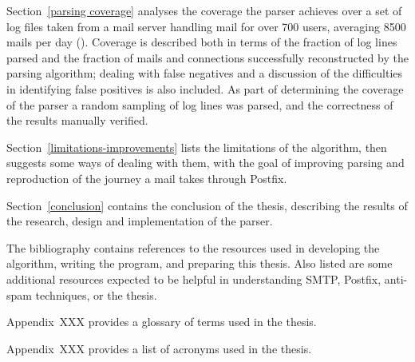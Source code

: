 Section~\ref{parsing coverage} analyses the coverage the parser achieves
over a set of \numberOFlogFILES{} log files taken from a mail server
handling mail for over 700 users, averaging 8500 mails per day
().  Coverage is described both
in terms of the fraction of log lines parsed and the fraction of mails and
connections successfully reconstructed by the parsing algorithm; dealing
with false negatives and a discussion of the difficulties in identifying
false positives is also included.  As part of determining the coverage of
the parser a random sampling of log lines was parsed, and the correctness
of the results manually verified.

Section~\ref{limitations-improvements} lists the limitations of the
algorithm, then suggests some ways of dealing with them, with the goal of
improving parsing and reproduction of the journey a mail takes through
Postfix.

Section~\ref{conclusion} contains the conclusion of the thesis, describing
the results of the research, design and implementation of the parser.

The bibliography contains references to the resources used in developing
the algorithm, writing the program, and preparing this thesis.  Also
listed are some additional resources expected to be helpful in
understanding \gls{SMTP}, Postfix, anti-spam techniques, or the thesis.

Appendix~XXX provides a glossary of terms used in the thesis.

Appendix~XXX provides a list of acronyms used in the thesis.

